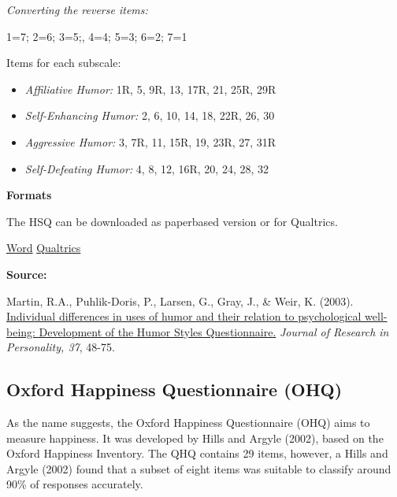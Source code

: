 \documentclass[
]{book}
\providecommand{\tightlist}{%
  \setlength{\itemsep}{0pt}\setlength{\parskip}{0pt}}
\begin{document}
\emph{Converting the reverse items:}

1=7; 2=6; 3=5;, 4=4; 5=3; 6=2; 7=1

Items for each subscale:

\begin{itemize}
\tightlist
\item
  \emph{Affiliative Humor:} 1R, 5, 9R, 13, 17R, 21, 25R, 29R
\item
  \emph{Self-Enhancing Humor:} 2, 6, 10, 14, 18, 22R, 26, 30
\item
  \emph{Aggressive Humor:} 3, 7R, 11, 15R, 19, 23R, 27, 31R
\item
  \emph{Self-Defeating Humor:} 4, 8, 12, 16R, 20, 24, 28, 32
\end{itemize}

\textbf{Formats}

The HSQ can be downloaded as paperbased version or for Qualtrics.

\href{link\%20to\%20file}{Word} \textbar{} \href{link\%20to\%20file}{Qualtrics}

\textbf{Source:}

Martin, R.A., Puhlik-Doris, P., Larsen, G., Gray, J., \& Weir, K. (2003). \href{https://d1wqtxts1xzle7.cloudfront.net/56892479/HSQ_article.pdf?1530281324=\&response-content-disposition=inline\%3B+filename\%3DIndividual_differences_in_uses_of_humor.pdf\&Expires=1598969255\&Signature=c2oQ1bWDYeWlwZslWOqrGvNdgjeYek-qW6UbPTZVWozQfdWJ8HAKPZHZRSACz1mNY6TYSVsbQgCYsC~1vG7IWPHEnUyQtT2cWsljBOMDj-m6KECtv9OSsQqBWQqTbOQbaGbyRGaCJbbdYEPr4uNZM8zVWZWB0cQU105xtYzzrqyrEQvnR-8x7Y2-7pCwPBMptT8CLRgiv4~WEz1auOoHClqgZ0pAg6Qe8oTVIYFaX40f0gT2At1JKH-xmb1-IHX7wWz9zux-3WMYZ0~jNi4kruIbEHnSS6HrAmF-sin3lWpItwnvWRJ2XbJEFvaU3HqsWTdmsM2WpnIwBQ8I5mCKpw__\&Key-Pair-Id=APKAJLOHF5GGSLRBV4ZA}{Individual differences in uses of humor and their relation to psychological well-being: Development of the Humor Styles Questionnaire.} \emph{Journal of Research in Personality, 37}, 48-75.

\hypertarget{oxford-happiness-questionnaire-ohq}{%
\subsection{Oxford Happiness Questionnaire (OHQ)}\label{oxford-happiness-questionnaire-ohq}}

As the name suggests, the Oxford Happiness Questionnaire (OHQ) aims to measure happiness. It was developed by Hills and Argyle (2002), based on the Oxford Happiness Inventory. The QHQ contains 29 items, however, a Hills and Argyle (2002) found that a subset of eight items was suitable to classify around 90\% of responses accurately.
\end{document}

